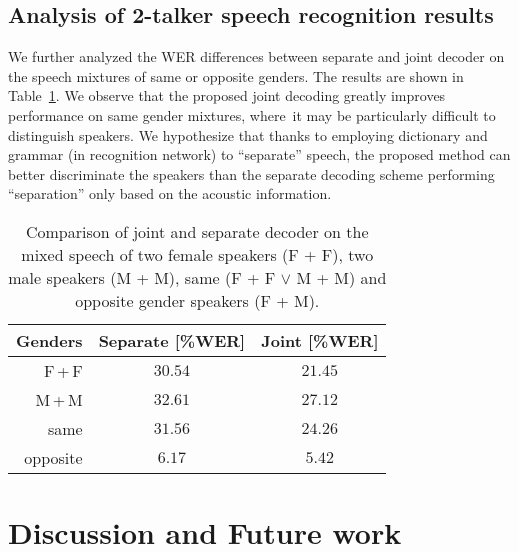 \documentclass[a4paper]{article}
\begin{document}
\subsection{Analysis of 2-talker speech recognition results}

We further analyzed the WER differences between separate and joint decoder on the speech mixtures of same or opposite genders.
The results are shown in Table~\ref{tab:gender_results}. We observe that the proposed joint decoding greatly improves performance on same gender mixtures, where~it may be particularly difficult to distinguish speakers. We hypothesize that thanks to employing dictionary and grammar (in recognition network) to ``separate'' speech, the proposed method can better discriminate the speakers than the separate decoding scheme performing ``separation'' only based on the acoustic information.

\begin{table}[tb]
\centering
\caption{Comparison of joint and separate decoder on the mixed speech of two female speakers (F + F), two male speakers (M + M), same (F + F $\lor$ M + M) and opposite gender speakers (F + M).}
\begin{tabular}{r|cc}
\toprule
Genders & Separate {[}\%WER{]} & Joint {[}\%WER{]} \\\midrule
F\,+\,F     &     $30.54$        &      $21.45$      \\
M\,+\,M     &     $32.61$        &      $27.12$       \\\midrule
same        &     $31.56$        &      $24.26$       \\
opposite    &     $6.17$         &      $5.42$       \\
\bottomrule         
\end{tabular}
\label{tab:gender_results}
\end{table}

\section{Discussion and Future work}
\label{sec:discussion}
\end{document}
